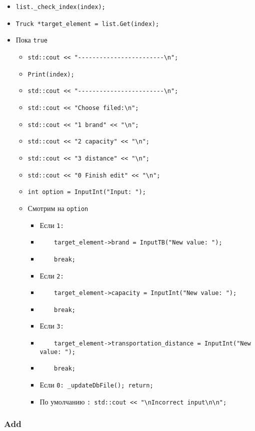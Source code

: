 \begin{itemize}
	\item \verb|list._check_index(index);|
	\item \verb|Truck *target_element = list.Get(index);|
	\item Пока \verb|true|
	\begin{itemize}
		\item \verb|std::cout << "------------------------\n";|
		\item \verb|Print(index);|
		\item \verb|std::cout << "------------------------\n";|
		\item \verb|std::cout << "Choose filed:\n";|
		\item \verb|std::cout << "1 brand" << "\n";|
		\item \verb|std::cout << "2 capacity" << "\n";|
		\item \verb|std::cout << "3 distance" << "\n";|
		\item \verb|std::cout << "0 Finish edit" << "\n";|
		\item \verb|int option = InputInt("Input: ");|
		\item Смотрим на \verb|option|
		\begin{itemize}
			\item Если \verb|1:|
			\item \verb|    target_element->brand = InputTB("New value: ");|
			\item \verb|    break;|
			\item Если \verb|2:|
			\item \verb|    target_element->capacity = InputInt("New value: ");|
			\item \verb|    break;|
			\item Если \verb|3:|
			\item \verb|    target_element->transportation_distance = InputInt("New value: ");|
			\item \verb|    break;|
			\item Если \verb|0: _updateDbFile(); return;|
			\item По умолчанию \verb|: std::cout << "\nIncorrect input\n\n";|
		\end{itemize}
	\end{itemize}
\end{itemize}

\subsubsection*{Add}

